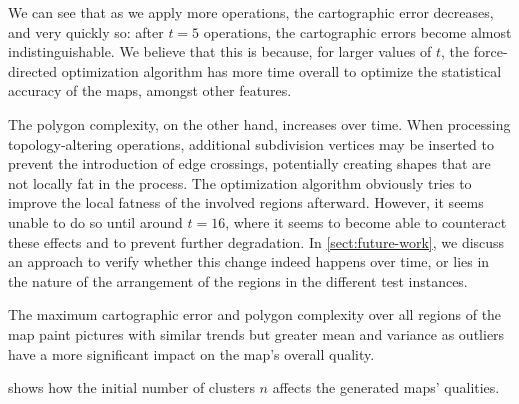 We can see that as we apply more operations, the cartographic error decreases, and very quickly so: after $t = 5$ operations, the cartographic errors become almost indistinguishable.
We believe that this is because, for larger values of $t$, the force-directed optimization algorithm has more time overall to optimize the statistical accuracy of the maps, amongst other features.

The polygon complexity, on the other hand, increases over time.
When processing topology-altering operations, additional subdivision vertices may be inserted to prevent the introduction of edge crossings, potentially creating shapes that are not locally fat in the process.
The optimization algorithm obviously tries to improve the local fatness of the involved regions afterward.
However, it seems unable to do so until around $t = 16$, where it seems to become able to counteract these effects and to prevent further degradation.
In \cref{sect:future-work}, we discuss an approach to verify whether this change indeed happens over time, or lies in the nature of the arrangement of the regions in the different test instances.

The maximum cartographic error and polygon complexity over all regions of the map paint pictures with similar trends but greater mean and variance as outliers have a more significant impact on the map's overall quality.

\vspace{1cm}

 shows how the initial number of clusters $n$ affects the generated maps' qualities.

